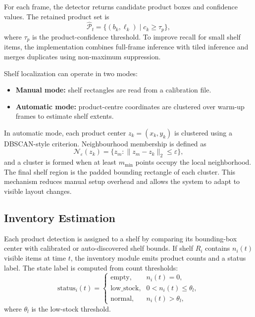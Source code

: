\documentclass[conference]{IEEEtran}
\begin{document}
For each frame, the detector returns candidate product boxes and confidence values. The retained product set is
\begin{equation}
\hat{\mathcal{P}}_t = \{(b_k, \ell_k) \mid c_k \geq \tau_p\},
\end{equation}
where $\tau_p$ is the product-confidence threshold. To improve recall for small shelf items, the implementation combines full-frame inference with tiled inference and merges duplicates using non-maximum suppression.

Shelf localization can operate in two modes:
\begin{itemize}
    \item \textbf{Manual mode:} shelf rectangles are read from a calibration file.
    \item \textbf{Automatic mode:} product-centre coordinates are clustered over warm-up frames to estimate shelf extents.
\end{itemize}

In automatic mode, each product center $z_k = (x_k, y_k)$ is clustered using a DBSCAN-style criterion. Neighbourhood membership is defined as
\begin{equation}
\mathcal{N}_{\varepsilon}(z_k) = \{z_m : \lVert z_m - z_k \rVert_2 \leq \varepsilon\},
\end{equation}
and a cluster is formed when at least $m_{\min}$ points occupy the local neighborhood. The final shelf region is the padded bounding rectangle of each cluster. This mechanism reduces manual setup overhead and allows the system to adapt to visible layout changes.

\subsection{Inventory Estimation}

Each product detection is assigned to a shelf by comparing its bounding-box center with calibrated or auto-discovered shelf bounds. If shelf $R_i$ contains $n_i(t)$ visible items at time $t$, the inventory module emits product counts and a status label. The state label is computed from count thresholds:
\begin{equation}
\text{status}_i(t) =
\begin{cases}
\text{empty}, & n_i(t)=0,\\
\text{low\_stock}, & 0 < n_i(t) \leq \theta_l,\\
\text{normal}, & n_i(t) > \theta_l,
\end{cases}
\end{equation}
where $\theta_l$ is the low-stock threshold.
\end{document}
